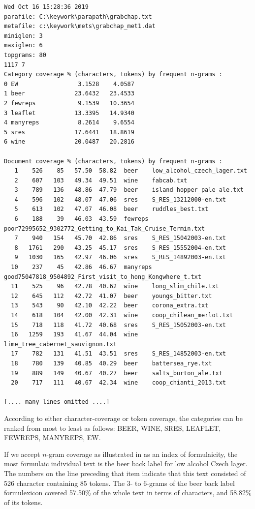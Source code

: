 \documentclass[output=paper]{langscibook}
\begin{document}
\begin{lstlisting}
Wed Oct 16 15:28:36 2019
parafile: C:\keywork\parapath\grabchap.txt
metafile: c:\keywork\mets\grabchap_met1.dat
miniglen: 3
maxiglen: 6
topgrams: 80
1117 7
Category coverage % (characters, tokens) by frequent n-grams :
0 EW                 3.1528    4.0587
1 beer              23.6432   23.4533
2 fewreps            9.1539   10.3654
3 leaflet           13.3395   14.9340
4 manyreps           8.2614    9.6554
5 sres              17.6441   18.8619
6 wine              20.0487   20.2816

Document coverage % (characters, tokens) by frequent n-grams :
   1    526    85   57.50  58.82  beer    low_alcohol_czech_lager.txt
   2    607   103   49.34  49.51  wine    fabcab.txt
   3    789   136   48.86  47.79  beer    island_hopper_pale_ale.txt
   4    596   102   48.07  47.06  sres    S_RES_13212000-en.txt
   5    613   102   47.07  46.08  beer    ruddles_best.txt
   6    188    39   46.03  43.59  fewreps poor72995652_9302772_Getting_to_Kai_Tak_Cruise_Termin.txt
   7    940   154   45.70  42.86  sres    S_RES_15042003-en.txt
   8   1761   290   43.25  45.17  sres    S_RES_15552004-en.txt
   9   1030   165   42.97  46.06  sres    S_RES_14892003-en.txt
  10    237    45   42.86  46.67  manyreps good75047818_9504892_First_visit_to_hong_Kongwhere_t.txt
  11    525    96   42.78  40.62  wine    long_slim_chile.txt
  12    645   112   42.72  41.07  beer    youngs_bitter.txt
  13    543    90   42.10  42.22  beer    corona_extra.txt
  14    618   104   42.00  42.31  wine    coop_chilean_merlot.txt
  15    718   118   41.72  40.68  sres    S_RES_15052003-en.txt
  16   1259   193   41.67  44.04  wine    lime_tree_cabernet_sauvignon.txt
  17    782   131   41.51  43.51  sres    S_RES_14852003-en.txt
  18    780   139   40.85  40.29  beer    battersea_rye.txt
  19    889   149   40.67  40.27  beer    salts_burton_ale.txt
  20    717   111   40.67  42.34  wine    coop_chianti_2013.txt

[.... many lines omitted ....]
\end{lstlisting}

According to either character-coverage or token coverage, the categories can be ranked from most to least as follows: BEER, WINE, SRES, LEAFLET, FEWREPS, MANYREPS, EW.

If we accept $n$-gram coverage as illustrated in  as an index of formulaicity, the most formulaic individual text is the beer back label for low alcohol Czech lager. The numbers on the line preceding that item indicate that this text consisted of 526 character containing 85 tokens. The 3- to 6-grams of the beer back label formulexicon covered 57.50\% of the whole text in terms of characters, and 58.82\% of its tokens.
\end{document}
